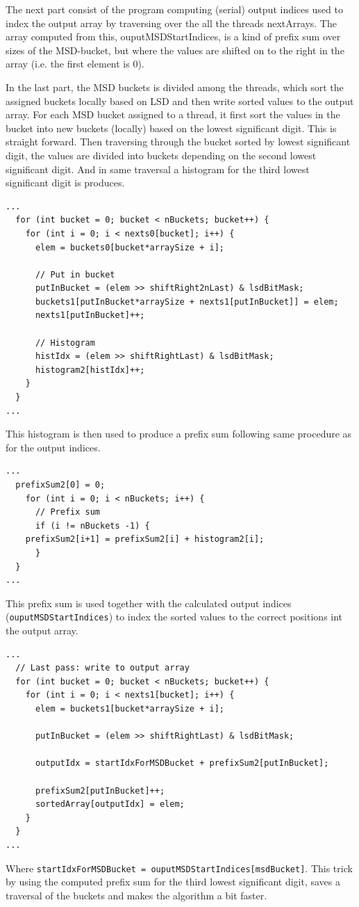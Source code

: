 The next part consist of the program computing (serial) output indices used to index the output array by traversing over the all the threads nextArrays.   
The array computed from this, ouputMSDStartIndices, is a kind of prefix sum over sizes of the MSD-bucket, but where the values are shifted on to the right in the array (i.e. the first element is 0).

In the last part, the MSD buckets is divided among the threads, which sort the assigned buckets locally based on LSD and then write sorted values to the output array.
For each MSD bucket assigned to a thread, it first sort the values in the bucket into new buckets (locally) based on the lowest significant digit. This is straight forward.
Then traversing through the bucket sorted by lowest significant digit, the values are divided into buckets depending on the second lowest significant digit.
And in same traversal a histogram for the third lowest significant digit is produces.
\begin{lstlisting}
...
  for (int bucket = 0; bucket < nBuckets; bucket++) {
    for (int i = 0; i < nexts0[bucket]; i++) {
      elem = buckets0[bucket*arraySize + i];

      // Put in bucket
      putInBucket = (elem >> shiftRight2nLast) & lsdBitMask;
      buckets1[putInBucket*arraySize + nexts1[putInBucket]] = elem;
      nexts1[putInBucket]++;

      // Histogram
      histIdx = (elem >> shiftRightLast) & lsdBitMask;
      histogram2[histIdx]++;
    }
  }
...
\end{lstlisting}
This histogram is then used to produce a prefix sum following same procedure as for the output indices.
\begin{lstlisting}
... 
  prefixSum2[0] = 0;
    for (int i = 0; i < nBuckets; i++) {
      // Prefix sum
      if (i != nBuckets -1) {
	prefixSum2[i+1] = prefixSum2[i] + histogram2[i];
      } 
  }
...
\end{lstlisting}

This prefix sum is used together with the calculated output indices (\verb!ouputMSDStartIndices!) to index the sorted values to the correct positions int the output array.
\begin{lstlisting}
...
  // Last pass: write to output array
  for (int bucket = 0; bucket < nBuckets; bucket++) {
    for (int i = 0; i < nexts1[bucket]; i++) {
      elem = buckets1[bucket*arraySize + i];

      putInBucket = (elem >> shiftRightLast) & lsdBitMask;

      outputIdx = startIdxForMSDBucket + prefixSum2[putInBucket];

      prefixSum2[putInBucket]++;
      sortedArray[outputIdx] = elem;
    }
  }
... 
\end{lstlisting}
Where \verb!startIdxForMSDBucket = ouputMSDStartIndices[msdBucket]!.
This trick by using the computed prefix sum for the third lowest significant digit, saves a traversal of the buckets and makes the algorithm a bit faster.

